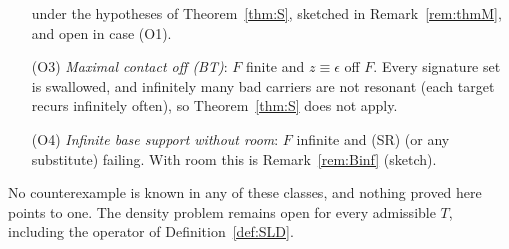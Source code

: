 \begin{remark}
\begin{enumerate}
under the hypotheses of Theorem~\ref{thm:S}, sketched in
Remark~\ref{rem:thmM}, and open in case (O1).
\item[(O3)] \emph{Maximal contact off \textup{(BT)}}: $F$ finite and
$z\equiv\epsilon$ off $F$.  Every signature set is swallowed, and
infinitely many bad carriers are not resonant (each target recurs
infinitely often), so Theorem~\ref{thm:S} does not apply.
\item[(O4)] \emph{Infinite base support without room}: $F$ infinite and
\textup{(SR)} (or any substitute) failing.  With room this is
Remark~\ref{rem:Binf} (sketch).
\end{enumerate}
No counterexample is known in any of these classes, and nothing proved here
points to one.  The density problem remains open for every admissible $T$,
including the operator of Definition~\ref{def:SLD}.
\end{remark}

